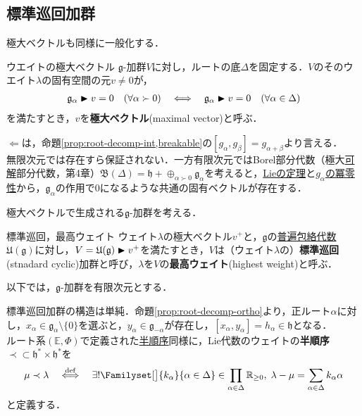 \documentclass[rep_main]{subfiles}
\begin{document}
\subsection{標準巡回加群}
極大ベクトルも同様に一般化する．
\begin{mydef}[label=def:weightspacerep]{ウエイトの極大ベクトル}
	$\mathfrak{g}$-加群$V$に対し，ルートの底$\Delta$を固定する．$V$のそのウエイト$\lambda$の固有空間の元$v \neq 0$が，
	\begin{align}
		\mathfrak{g}_\alpha \blacktriangleright v = 0\quad  (\forall \alpha \succ 0)  \quad \Longleftrightarrow \quad  \mathfrak{g}_\alpha \blacktriangleright v = 0\quad  (\forall \alpha \in \Delta)
	\end{align}
	を満たすとき，$v$を\textbf{極大ベクトル}(maximal vector)と呼ぶ．
\end{mydef}
$\Longleftarrow$は，命題\ref{prop:root-decomp-int,breakable}の$[g_\alpha, g_\beta] = g_{\alpha + \beta}$より言える．\\
無限次元では存在すら保証されない．一方有限次元ではBorel部分代数（極大\hyperref[def:solvable-LieAlg]{可解}部分代数，第4章）$\mathfrak{B}(\Delta) = \mathfrak{h} + \oplus_{\alpha \succ 0} \mathfrak{g}_\alpha$を考えると，\hyperref[thm:Lie]{Lieの定理}と\hyperref[root-decomp-basic1]{$g_\alpha$の冪零性}から，$\mathfrak{g}_\alpha$の作用で$0$になるような共通の固有ベクトルが存在する．

極大ベクトルで生成される$\mathfrak{g}$-加群を考える．
\begin{mydef}[label=def:standard-cyclic]{標準巡回，最高ウェイト}
	ウェイト$\lambda$の極大ベクトル$v^+$と，$\mathfrak{g}$の\hyperref[def:univ-env-alg]{普遍包絡代数}$\mathfrak{U}(\mathfrak{g})$に対し，$V = \mathfrak{U}(\mathfrak{g}) \blacktriangleright v^+$を満たすとき，$V$は（ウェイト$\lambda$の）\textbf{標準巡回}(stnadard cyclic)加群と呼び，$\lambda$を$V$の\textbf{最高ウェイト}(highest weight)と呼ぶ．
\end{mydef}
以下では，$\mathfrak{g}$-加群を有限次元とする．

標準巡回加群の構造は単純．命題\ref{prop:root-decomp-ortho}より，正ルート$\alpha$に対し，$x_\alpha \in \mathfrak{g}_\alpha\setminus\{0\}$を選ぶと，$y_\alpha \in \mathfrak{g}_{-\alpha}$が存在し，$[x_\alpha, y_\alpha] = h_\alpha \in \mathfrak{h}$となる．\\
ルート系$(\mathbb{E}, \Phi)$で定義された\hyperref[def:base-root,breakable]{半順序}同様に，Lie代数のウェイトの\textbf{半順序}$\prec \subset \mathfrak{h}^* \times \mathfrak{h}^*$を
\begin{equation}
	\mu \prec \lambda  \DEF  \exists! \Familyset[\big]{k_\alpha}{\alpha \in \Delta} \in \prod_{\alpha \in \Delta} \mathbb{R}_{\ge 0},\; \lambda - \mu = \sum_{\alpha \in \Delta} k_\alpha \alpha
\end{equation}
と定義する．
\end{document}
